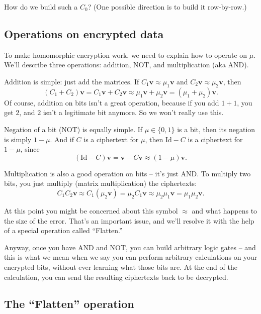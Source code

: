 \begin{exercise}{}{}
How do we build such a $C_{0}$? (One possible direction is to build it
row-by-row.)
\end{exercise}

\subsection{Operations on encrypted data}

To make homomorphic encryption work, we need to explain how to operate
on $\mu$. We'll describe three operations: addition, NOT, and
multiplication (aka AND).

Addition is simple: just add the matrices. If
$C_{1}\mathbf{v} \approx \mu_{1}\mathbf{v}$ and
$C_{2}\mathbf{v} \approx \mu_{2}\mathbf{v}$, then
\[( C_{1} + C_{2} )\mathbf{v} = C_{1}\mathbf{v} + C_{2}\mathbf{v} \approx \mu_{1}\mathbf{v} + \mu_{2}\mathbf{v} = ( \mu_{1} + \mu_{2} )\mathbf{v}.\]
Of course, addition on bits isn't a great operation, because if you add
$1 + 1$, you get $2$, and $2$ isn't a legitimate bit anymore. So
we won't really use this.

Negation of a bit (NOT) is equally simple. If
$\mu \in \{ 0,1 \}$ is a bit, then its negation is simply
$1 - \mu$. And if $C$ is a ciphertext for $\mu$, then
$\mathrm{Id} - C$ is a ciphertext for $1 - \mu$, since
\[( \mathrm{Id} - C )\mathbf{v} = \mathbf{v} - C\mathbf{v} \approx (1 - \mu)\mathbf{v}.\]

Multiplication is also a good operation on bits -- it's just AND. To
multiply two bits, you just multiply (matrix multiplication) the
ciphertexts:
\[C_{1}C_{2}\mathbf{v} \approx C_{1}( \mu_{2}\mathbf{v} ) = \mu_{2}C_{1}\mathbf{v} \approx \mu_{2}\mu_{1}\mathbf{v} = \mu_{1}\mu_{2}\mathbf{v}.\]

At this point you might be concerned about this symbol $\approx$ and
what happens to the size of the error. That's an important issue, and
we'll resolve it with the help of a special operation called
``Flatten.''

Anyway, once you have AND and NOT, you can build arbitrary logic gates
-- and this is what we mean when we say you can perform arbitrary
calculations on your encrypted bits, without ever learning what those
bits are. At the end of the calculation, you can send the resulting
ciphertexts back to be decrypted.

\subsection{The ``Flatten''
operation}\label{a-constraint-on-the-secret-key-mathbfv-and-the-flatten-operation}

